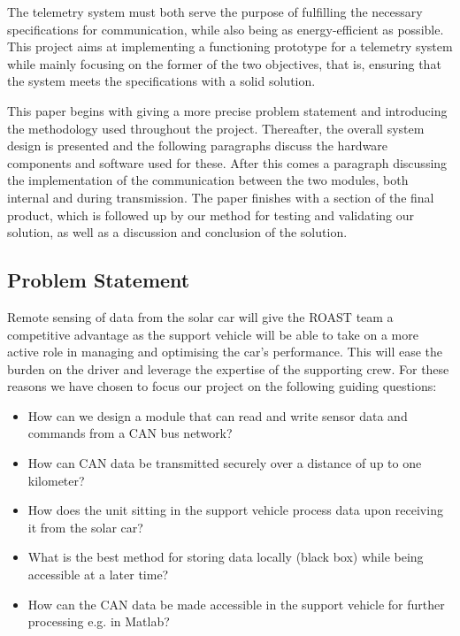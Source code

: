 \documentclass[conference]{IEEEtran}
\begin{document}
The telemetry system must both serve the purpose of fulfilling the necessary specifications for communication, while also being as energy-efficient as possible. This project aims at implementing a functioning prototype for a telemetry system while mainly focusing on the former of the two objectives, that is, ensuring that the system meets the specifications with a solid solution.

This paper begins with giving a more precise problem statement and introducing the methodology used throughout the project. Thereafter, the overall system design is presented and the following paragraphs discuss the hardware components and software used for these. After this comes a paragraph discussing the implementation of the communication between the two modules, both internal and during transmission. The paper finishes with a section of the final product, which is followed up by our method for testing and validating our solution, as well as a discussion and conclusion of the solution.

\subsection{Problem Statement}
Remote sensing of data from the solar car will give the ROAST team a competitive advantage as the support vehicle will be able to take on a more active role in managing and optimising the car's performance. This will ease the burden on the driver and leverage the expertise of the supporting crew. For these reasons we have chosen to focus our project on the following guiding questions:
\begin{itemize}
    \item How can we design a module that can read and write sensor data and commands from a CAN bus network? 
    \item How can CAN data be transmitted securely over a distance of up to one kilometer?
    \item How does the unit sitting in the support vehicle process data upon receiving it from the solar car?
    \item What is the best method for storing data locally (black box) while being accessible at a later time?
    \item How can the CAN data be made accessible in the support vehicle for further processing e.g. in Matlab?
\end{itemize}
\end{document}
